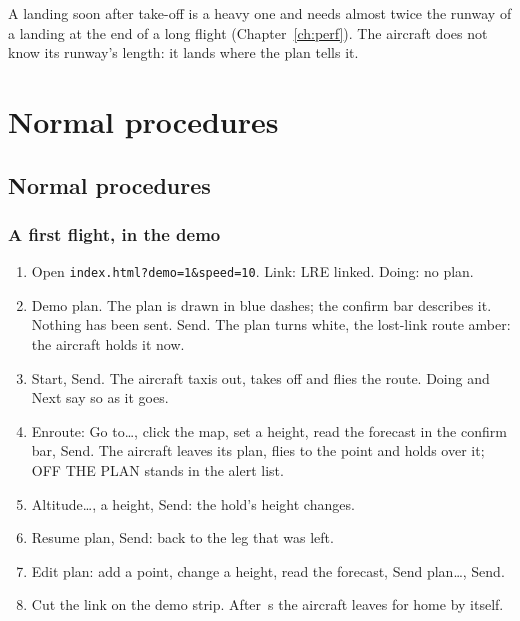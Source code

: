 \documentclass[11pt,a4paper,oneside]{book}
\newcommand{\ann}[1]{\textsf{#1}}
\begin{document}
\begin{caution}
A landing soon after take-off is a heavy one and needs almost twice the runway of a landing at the end of a long
flight (Chapter~\ref{ch:perf}). The aircraft does not know its runway's length: it lands where the plan tells it.
\end{caution}

\part{Normal procedures}
\chapter{Normal procedures}\label{ch:normal}
\section{A first flight, in the demo}
\begin{enumerate}
\item Open \texttt{index.html?demo=1\&speed=10}. \ann{Link}: \ann{LRE linked}. \ann{Doing}: \ann{no plan}.
\item \ann{Demo plan}. The plan is drawn in blue dashes; the confirm bar describes it. Nothing has been sent.
\ann{Send}. The plan turns white, the lost-link route amber: the aircraft holds it now.
\item \ann{Start}, \ann{Send}. The aircraft taxis out, takes off and flies the route. \ann{Doing} and \ann{Next} say
so as it goes.
\item Enroute: \ann{Go to\ldots}, click the map, set a height, read the forecast in the confirm bar, \ann{Send}. The
aircraft leaves its plan, flies to the point and holds over it; \ann{OFF THE PLAN} stands in the alert list.
\item \ann{Altitude\ldots}, a height, \ann{Send}: the hold's height changes.
\item \ann{Resume plan}, \ann{Send}: back to the leg that was left.
\item \ann{Edit plan}: add a point, change a height, read the forecast, \ann{Send plan\ldots}, \ann{Send}.
\item \ann{Cut the link} on the demo strip. After \MLinkTimeout\,s the aircraft leaves for home by itself.
\end{enumerate}
\end{document}
